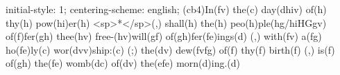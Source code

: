 initial-style: 1;
centering-scheme: english;
(cb4)In(fv) the(c) day(dhiv) of(h) thy(h) pow(hi)er(h) <sp>*</sp>(,) shall(h) the(h) peo(h)ple(hg/hiHGgv) of(f)fer(gh) thee(hv) free-(hv)will(gf) of(gh)fer(fe)ings(d) (,) with(fv) a(fg) ho(fe)ly(c) wor(dvv)ship:(c) (;) the(dv) dew(fvfg) of(f) thy(f) birth(f) (,) is(f) of(gh) the(fe) womb(dc) of(dv) the(efe) morn(d)ing.(d)
